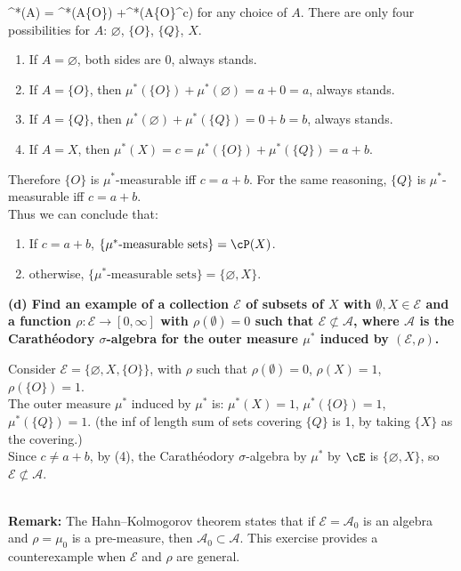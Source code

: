\documentclass[lang=cn,11pt]{elegantbook}
\begin{document}
  \mu^*(A) \;=\;
  \mu^*(A\cap \{O\}) \;+\;\mu^*(A\cap \{O\}^c)
  \) for any choice of $A$.
There are only four possibilities for \(A\): \(\varnothing\), \(\{O\}\), \(\{Q\}\), \(X\).
\begin{enumerate}
    \item   If \(A = \varnothing\), both sides are 0, always stands.
    \item If \(A = \{O\}\), then \(\mu^*(\{O\}) + \mu^*(\varnothing)=a+0=a\), always stands.
    \item If \(A = \{Q\}\), then \(\mu^*(\varnothing)+\mu^*(\{Q\})=0+b=b\), always stands.
    \item If \(A = X\), then \(\mu^*(X)=c =\mu^*(\{O\})+\mu^*(\{Q\})=a+b\).
\end{enumerate}
\noindent Therefore $\{O\}$ is \(\mu^*\)-measurable iff $c =a+b$.  For the same reasoning, \(\{Q\}\) is \(\mu^*\)-measurable iff \(c = a+b\).\\
Thus we can conclude that:
\begin{enumerate}
    \item If \(c = a+b\), $\{   \mu^* \text{-measurable sets}   \} =  \cP(X)$.
    \item otherwise, $\{   \mu^* \text{-measurable sets}   \} =  \{\varnothing, X\}$.
\end{enumerate}
\noindent \textbf{(d) Find an example of a collection \(\mathcal{E}\) of subsets of \(X\) with \(\emptyset, X \in \mathcal{E}\) and a function \(\rho : \mathcal{E} \to [0, \infty]\) with \(\rho(\emptyset) = 0\) such that \(\mathcal{E} \not\subset \mathcal{A}\), where \(\mathcal{A}\) is the Carathéodory \(\sigma\)-algebra for the outer measure \(\mu^*\) induced by \((\mathcal{E}, \rho)\).}
\begin{solution}
\noindent Consider \(\mathcal{E}=\{\varnothing,X,\{O\}\}\), with $\rho$ such that \(\rho(\emptyset)=0\), \(\rho(X)=1\), \(\rho(\{O\})=1\). \\ \noindent The outer measure \(\mu^*\) induced by $\mu^*$ is: \(\mu^*(X)=1\), \(\mu^*(\{O\})=1\), \(\mu^*(\{Q\})=1\). (the inf of length sum of sets covering $\{Q\}$ is 1, by taking $\{X\}$ as the covering.)\\
\noindent Since \(c \not = a+b\), by (4), the Carathéodory \(\sigma\)-algebra by $\mu^*$ by $\cE$ is \(\{\varnothing,X\}\), so \(\mathcal{E}\not\subset \mathcal{A}\).\\\\
\end{solution}
\noindent \textbf{Remark:} The Hahn–Kolmogorov theorem states that if \(\mathcal{E} = \mathcal{A}_0\) is an algebra and \(\rho = \mu_0\) is a pre-measure, then \(\mathcal{A}_0 \subset \mathcal{A}\). This exercise provides a counterexample when \(\mathcal{E}\) and \(\rho\) are general.
\end{document}
